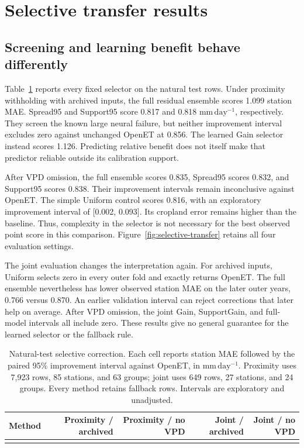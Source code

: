 \documentclass[10pt,letterpaper]{article}
\makeatletter
\let\tableinput\@@input
\newcommand{\unit}{\mathrm{mm\,day^{-1}}}
\makeatother
\begin{document}
\section{Selective transfer results}\label{sec:selection-results}
\subsection{Screening and learning benefit behave differently}
Table~\ref{tab:selective-natural} reports every fixed selector on the natural test rows.
Under proximity withholding with archived inputs, the full residual ensemble scores 1.099 station MAE.
Spread95 and Support95 score 0.817 and 0.818 $\unit$, respectively.
They screen the known large neural failure, but neither improvement interval excludes zero against unchanged OpenET at 0.856.
The learned Gain selector instead scores 1.126.
Predicting relative benefit does not itself make that predictor reliable outside its calibration support.

After VPD omission, the full ensemble scores 0.835, Spread95 scores 0.832, and Support95 scores 0.838.
Their improvement intervals remain inconclusive against OpenET.
The simple Uniform control scores 0.816, with an exploratory improvement interval of [0.002, 0.093].
Its cropland error remains higher than the baseline.
Thus, complexity in the selector is not necessary for the best observed point score in this comparison.
Figure~\ref{fig:selective-transfer} retains all four evaluation settings.

The joint evaluation changes the interpretation again.
For archived inputs, Uniform selects zero in every outer fold and exactly returns OpenET.
The full ensemble nevertheless has lower observed station MAE on the later outer years, 0.766 versus 0.870.
An earlier validation interval can reject corrections that later help on average.
After VPD omission, the joint Gain, SupportGain, and full-model intervals all include zero.
These results give no general guarantee for the learned selector or the fallback rule.

\begin{table}[t]
\captionsetup{width=.96\textwidth}
\centering\footnotesize
\caption{Natural-test selective correction. Each cell reports station MAE followed by the paired 95\% improvement interval against OpenET, in $\unit$. Proximity uses 7,923 rows, 85 stations, and 63 groups; joint uses 649 rows, 27 stations, and 24 groups. Every method retains fallback rows. Intervals are exploratory and unadjusted.}
\label{tab:selective-natural}
\begin{tabular}{lrrrr}\toprule
Method & Proximity / archived & Proximity / no VPD & Joint / archived & Joint / no VPD\\\midrule
\tableinput{table_selective_natural.tex}
\bottomrule\end{tabular}
\end{table}
\end{document}
